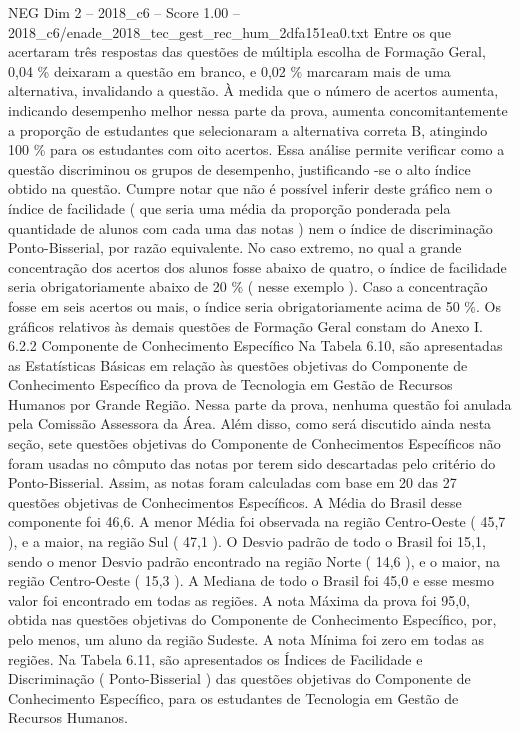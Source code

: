 \begin{textsample}{NEG Dim 2 – 2018\_c6 – Score 1.00 – 2018\_c6/enade\_2018\_tec\_gest\_rec\_hum\_2dfa151ea0.txt}
Entre os que acertaram três respostas das questões de múltipla escolha de Formação Geral, 0,04 \% deixaram a questão em branco, e 0,02 \% marcaram mais de uma alternativa, invalidando a questão.
À medida que o número de acertos aumenta, indicando desempenho melhor nessa parte da prova, aumenta concomitantemente a proporção de estudantes que selecionaram a alternativa correta B, atingindo 100 \% para os estudantes com oito acertos.
Essa análise permite verificar como a questão discriminou os grupos de desempenho, justificando -se o alto índice obtido na questão.
Cumpre notar que não é possível inferir deste gráfico nem o índice de facilidade ( que seria uma média da proporção ponderada pela quantidade de alunos com cada uma das notas ) nem o índice de discriminação Ponto-Bisserial, por razão equivalente.
No caso extremo, no qual a grande concentração dos acertos dos alunos fosse abaixo de quatro, o índice de facilidade seria obrigatoriamente abaixo de 20 \% ( nesse exemplo ).
Caso a concentração fosse em seis acertos ou mais, o índice seria obrigatoriamente acima de 50 \%.
Os gráficos relativos às demais questões de Formação Geral constam do Anexo I. 6.2.2 Componente de Conhecimento Específico Na Tabela 6.10, são apresentadas as Estatísticas Básicas em relação às questões objetivas do Componente de Conhecimento Específico da prova de Tecnologia em Gestão de Recursos Humanos por Grande Região.
Nessa parte da prova, nenhuma questão foi anulada pela Comissão Assessora da Área.
Além disso, como será discutido ainda nesta seção, sete questões objetivas do Componente de Conhecimentos Específicos não foram usadas no cômputo das notas por terem sido descartadas pelo critério do Ponto-Bisserial.
Assim, as notas foram calculadas com base em 20 das 27 questões objetivas de Conhecimentos Específicos.
A Média do Brasil desse componente foi 46,6.
A menor Média foi observada na região Centro-Oeste ( 45,7 ), e a maior, na região Sul ( 47,1 ).
O Desvio padrão de todo o Brasil foi 15,1, sendo o menor Desvio padrão encontrado na região Norte ( 14,6 ), e o maior, na região Centro-Oeste ( 15,3 ).
A Mediana de todo o Brasil foi 45,0 e esse mesmo valor foi encontrado em todas as regiões.
A nota Máxima da prova foi 95,0, obtida nas questões objetivas do Componente de Conhecimento Específico, por, pelo menos, um aluno da região Sudeste.
A nota Mínima foi zero em todas as regiões.
Na Tabela 6.11, são apresentados os Índices de Facilidade e Discriminação ( Ponto-Bisserial ) das questões objetivas do Componente de Conhecimento Específico, para os estudantes de Tecnologia em Gestão de Recursos Humanos.

\end{textsample}
